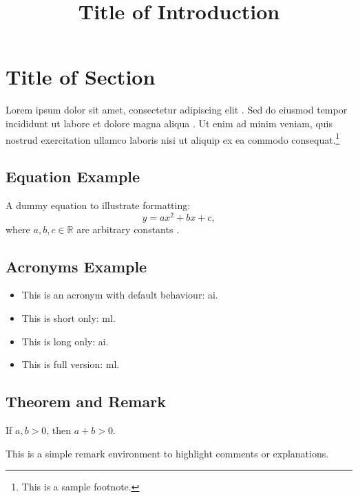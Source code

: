\title{Title of Introduction}
\label{sec:intro}
\maketitle

\section{Title of Section}
Lorem ipsum dolor sit amet, consectetur adipiscing elit \cite{doe2020lorem}.  
Sed do eiusmod tempor incididunt ut labore et dolore magna aliqua \cite{roe2018ipsum}.  
Ut enim ad minim veniam, quis nostrud exercitation ullamco laboris nisi ut aliquip ex ea commodo consequat.\footnote{This is a sample footnote.}  

\subsection{Equation Example}

A dummy equation to illustrate formatting:
\begin{equation}
    y = a x^2 + b x + c,
\end{equation}
where $a, b, c \in \mathbb{R}$ are arbitrary constants \cite{smith2015dolor}.

\subsection{Acronyms Example}
\begin{itemize}
    \item This is an acronym with default behaviour: \gls{ai}.
    \item This is short only: \acrshort{ml}.
    \item This is long only: \acrlong{ai}.
    \item This is full version: \acrfull{ml}.
\end{itemize}

\subsection{Theorem and Remark}

\begin{theorem}
If $a, b > 0$, then $a+b > 0$.
\end{theorem}

\begin{remark}
This is a simple remark environment to highlight comments or explanations.
\end{remark}

